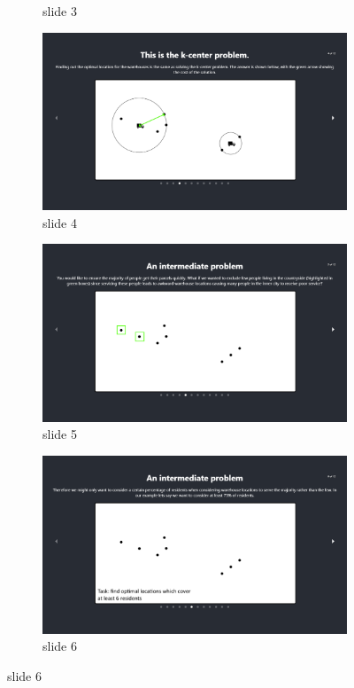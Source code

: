 \begin{figure}[H]
\begin{subfigure}{0.5\textwidth}
        \caption{slide 3}
    \end{subfigure}
    \begin{subfigure}{0.5\textwidth}
        \centering
        \includegraphics[width=\textwidth]{images/learn_03-base.png}
        \caption{slide 4}
    \end{subfigure}
    \begin{subfigure}{0.5\textwidth}
        \centering
        \includegraphics[width=\textwidth]{images/learn_04-base.png}
        \caption{slide 5}
    \end{subfigure}
    \begin{subfigure}{0.5\textwidth}
        \centering
        \includegraphics[width=\textwidth]{images/learn_05-base.png}
        \caption{slide 6}
    \end{subfigure}
\end{figure}

